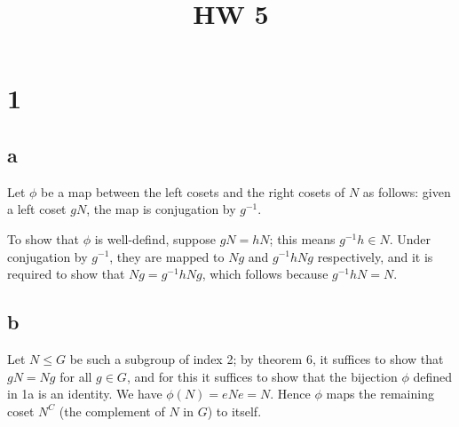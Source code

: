 \documentclass{article}
\title{HW 5}
\date{}
\def\inv{{-1}}
\begin{document}
\maketitle

\section*{1}






\subsection*{a}

Let $\phi$ be a map between the left cosets and the right cosets of $N$ as follows: given a left coset $gN$, the map is conjugation by $g^\inv$.

To show that $\phi$ is well-defind, suppose $gN = hN$; this means $g^\inv h \in N$. Under conjugation by $g^\inv$, they are mapped to $Ng$ and $g^\inv h Ng$ respectively, and it is required to show that $Ng = g^\inv h Ng$, which follows because $g^\inv h N = N$.

\subsection*{b}

Let $N \le G$ be such a subgroup of index 2; by theorem 6, it suffices to show that $gN = Ng$ for all $g \in G$, and for this it suffices to show that the bijection $\phi$ defined in 1a is an identity. We have $\phi(N) = eNe = N$. Hence $\phi$ maps the remaining coset $N^C$ (the complement of $N$ in $G$) to itself.
\end{document}
